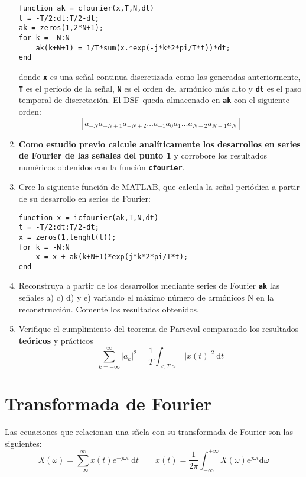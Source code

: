 \documentclass{article}
\newcommand{\code}[1]{\texttt{\textbf{#1}}}
\newcommand{\dt}{\:\mathrm{d}t}
\begin{document}
\begin{enumerate}[leftmargin=*]
	\begin{lstlisting}
function ak = cfourier(x,T,N,dt)
t = -T/2:dt:T/2-dt;
ak = zeros(1,2*N+1);
for k = -N:N
	ak(k+N+1) = 1/T*sum(x.*exp(-j*k*2*pi/T*t))*dt;
end
	\end{lstlisting}
	
donde \code{x} es una señal continua discretizada como las generadas anteriormente, \code{T} es el periodo de la señal, \code{N} es el orden del armónico más alto y \code{dt} es el paso temporal de discretación. El DSF queda almacenado en \code{ak} con el siguiente orden: \[ \left[a_{-N}a_{-N+1}a_{-N+2}\dots a_{-1}a_0a_1\dots a_{N-2}a_{N-1}a_{N}\right] \]
\item \textbf{Como estudio previo calcule analíticamente los desarrollos en series de Fourier de las señales del punto 1} y corrobore los resultados numéricos obtenidos con la función \code{cfourier}.


\item Cree la siguiente función de MATLAB, que calcula la señal periódica a partir de su desarrollo en series de Fourier:

\begin{lstlisting}
function x = icfourier(ak,T,N,dt)
t = -T/2:dt:T/2-dt;
x = zeros(1,lenght(t));
for k = -N:N
	x = x + ak(k+N+1)*exp(j*k*2*pi/T*t);
end
\end{lstlisting}
\item Reconstruya a partir de los desarrollos mediante series de Fourier \code{ak} las señales a) c) d) y e) variando el máximo número de armónicos N en la reconstrucción. Comente los resultados obtenidos.

\item Verifique el cumplimiento del teorema de Parseval comparando los resultados \textbf{teóricos} y prácticos \[ \sum_{k=-\infty}^{\infty}|a_k|^2=\dfrac{1}{T}\int_{<T>}|x(t)|^2\dt \]
\end{enumerate}
\section{Transformada de Fourier}
Las ecuaciones que relacionan una sñela con su transformada de Fourier son las siguientes: \[ X(\omega)=\sum_{-\infty}^{\infty}x(t)e^{-j\omega t}\dt\qquad x(t)=\dfrac{1}{2\pi}\int_{-\infty}^{+\infty}X(\omega)e^{j\omega t}\mathrm{d}\omega \]
\end{document}
